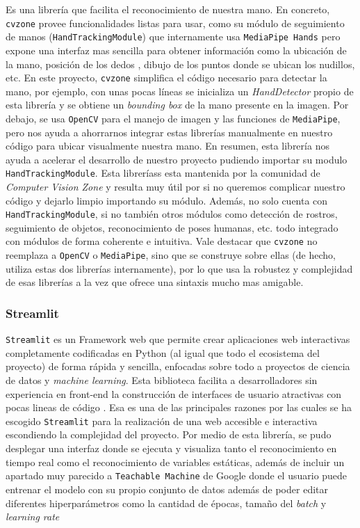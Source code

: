 Es una librería que facilita el reconocimiento de nuestra mano. En concreto, \texttt{cvzone} provee funcionalidades listas para usar, como su módulo de seguimiento de manos (\texttt{HandTrackingModule}) que internamente usa \texttt{MediaPipe Hands} pero expone una interfaz mas sencilla para obtener información como la ubicación de la mano, posición de los dedos , dibujo de los puntos donde se ubican los nudillos, etc. En este proyecto, \texttt{cvzone} simplifica el código necesario para detectar la mano, por ejemplo, con unas pocas líneas se inicializa un \textit{HandDetector} propio de esta librería y se obtiene un \textit{bounding box} de la mano presente en la imagen. 
Por debajo, se usa \texttt{OpenCV} para el manejo de imagen y las funciones de \texttt{MediaPipe}, pero nos ayuda a ahorrarnos integrar estas librerías manualmente en nuestro código para ubicar visualmente nuestra mano.
En resumen, esta librería nos ayuda a acelerar el desarrollo de nuestro proyecto pudiendo importar su modulo \texttt{HandTrackingModule}.  Esta libreríass esta mantenida por la comunidad de \textit{Computer Vision Zone} y resulta muy útil por si no queremos complicar nuestro código y dejarlo limpio importando su módulo. Además, no solo cuenta con \texttt{HandTrackingModule}, si no también otros módulos como detección de rostros, seguimiento de objetos, reconocimiento de poses humanas, etc. todo integrado con módulos de forma coherente e intuitiva. Vale destacar que \texttt{cvzone} no reemplaza a \texttt{OpenCV} o \texttt{MediaPipe}, sino que se construye sobre ellas (de hecho, utiliza estas dos librerías internamente), por lo que usa la robustez y complejidad de esas librerías a la vez que ofrece una sintaxis mucho mas amigable.

\subsubsection{Streamlit}


\texttt{Streamlit} es un Framework web que permite crear aplicaciones web interactivas completamente codificadas en Python (al igual que todo el ecosistema del proyecto) de forma rápida y sencilla, enfocadas sobre todo a proyectos de ciencia de datos y \textit{machine learning}. Esta biblioteca facilita a desarrolladores sin experiencia en front-end la construcción de interfaces de usuario atractivas con pocas lineas de código \cite{web:streamlit}. Esa es una de las principales razones por las cuales se ha escogido \texttt{Streamlit} para la realización de una web accesible e interactiva escondiendo la complejidad del proyecto. Por medio de esta librería, se pudo desplegar una interfaz donde se ejecuta y visualiza tanto el reconocimiento en tiempo real como el reconocimiento de variables estáticas, además de incluir un apartado muy parecido a \texttt{Teachable Machine} de Google donde el usuario puede entrenar el modelo con su propio conjunto de datos además de poder editar diferentes hiperparámetros como la cantidad de épocas, tamaño del \textit{batch} y \textit{learning rate}

